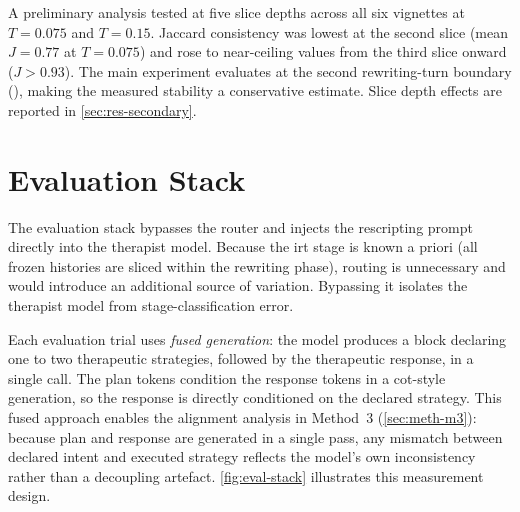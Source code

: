 A preliminary analysis tested  at five slice
depths across all six vignettes at $T = 0.075$ and $T = 0.15$. Jaccard
consistency was lowest at the second slice (mean $J = 0.77$ at $T = 0.075$)
and rose to near-ceiling values from the third slice onward ($J > 0.93$).
The main experiment evaluates at the second rewriting-turn boundary
(), making the measured stability a conservative estimate.
Slice depth effects are reported in \autoref{sec:res-secondary}.



\section{Evaluation Stack}
\label{sec:meth-eval}

The evaluation stack bypasses the router and injects the rescripting prompt
directly into the therapist model. Because the \gls{irt} stage is known a
priori (all frozen histories are sliced within the rewriting phase), routing
is unnecessary and would introduce an additional source of variation.
Bypassing it isolates the therapist model from stage-classification error.

Each evaluation trial uses \emph{fused generation}: the model produces a
 block declaring one to two therapeutic strategies, followed
by the therapeutic response, in a single call. The plan tokens condition the
response tokens in a \gls{cot}-style generation, so the response is
directly conditioned on the declared strategy. This fused approach enables
the alignment analysis in Method~3 (\autoref{sec:meth-m3}): because plan
and response are generated in a single pass, any mismatch between declared
intent and executed strategy reflects the model's own inconsistency rather
than a decoupling artefact. \autoref{fig:eval-stack} illustrates this
measurement design.

